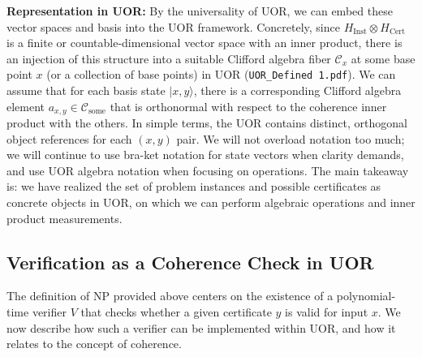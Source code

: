 \documentclass[11pt]{article}
\begin{document}
\textbf{Representation in UOR:} By the universality of UOR, we can embed these vector spaces and basis into the UOR framework. Concretely, since \(H_{\text{Inst}} \otimes H_{\text{Cert}}\) is a finite or countable-dimensional vector space with an inner product, there is an injection of this structure into a suitable Clifford algebra fiber \(\mathcal{C}_x\) at some base point \(x\) (or a collection of base points) in UOR (\texttt{UOR\_Defined 1.pdf}). We can assume that for each basis state \(|x,y\rangle\), there is a corresponding Clifford algebra element \(a_{x,y} \in \mathcal{C}_{\text{some}}\) that is orthonormal with respect to the coherence inner product with the others. In simple terms, the UOR contains distinct, orthogonal object references for each \((x,y)\) pair. We will not overload notation too much; we will continue to use bra-ket notation for state vectors when clarity demands, and use UOR algebra notation when focusing on operations. The main takeaway is: we have realized the set of problem instances and possible certificates as concrete objects in UOR, on which we can perform algebraic operations and inner product measurements.

\subsection{Verification as a Coherence Check in UOR}
The definition of NP provided above centers on the existence of a polynomial-time verifier \(V\) that checks whether a given certificate \(y\) is valid for input \(x\). We now describe how such a verifier can be implemented within UOR, and how it relates to the concept of coherence.
\end{document}
